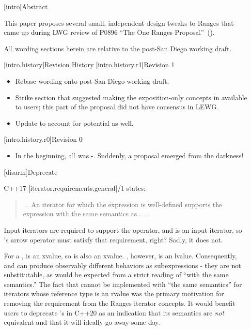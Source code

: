 [intro]{Abstract}

This paper proposes several small, independent design tweaks to Ranges that came
up during LWG review of P0896 ``The One Ranges Proposal''~(\cite{P0896}).

All wording sections herein are relative to the post-San Diego working draft.

[intro.history]{Revision History}
[intro.history.r1]{Revision 1}
\begin{itemize}
\item Rebase wording onto post-San Diego working draft.
\item Strike section that suggested making the exposition-only concepts
  in  available to users; this part of the proposal
  did not have consensus in LEWG.
\item Update  to account for potential 
  as well.
\end{itemize}
[intro.history.r0]{Revision 0}
\begin{itemize}
\item In the beginning, all was \cv-. Suddenly, a proposal emerged
  from the darkness!
\end{itemize}

[disarm]{Deprecate }

C++17 [iterator.requirements.general]/1 states:
\begin{quote}
... An iterator  for which the expression  is well-defined
supports the expression  with the same semantics as . ...
\end{quote}
Input iterators are required to support the \tcode{->}
operator,
and  is an input iterator,
so 's arrow operator must satisfy that requirement, right?
Sadly, it does not.

For a ,  is an xvalue, so  is also
an xvalue. , however, is an lvalue. Consequently,  and
 can produce observably different behaviors as subexpressions - they
are not substitutable, as would be expected from a strict reading of ``with the
same semantics.'' The fact that \tcode{->} cannot be implemented with ``the same
semantics'' for iterators whose reference type is an rvalue was the primary
motivation for removing the \tcode{->} requirement from the Ranges iterator
concepts. It would benefit users to deprecate 's
 in C++20 as an indication that its semantics are \textit{not}
equivalent and that it will ideally go away some day.


